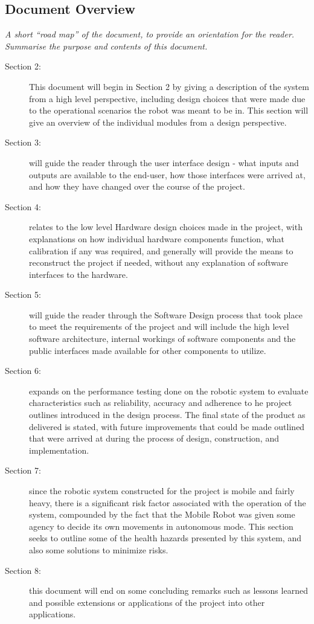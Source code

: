 \documentclass[MTRX3700report.tex]{subfiles}
\begin{document}
\subsection{Document Overview}
  \textit{A short “road map” of the document, to provide an orientation for the reader. Summarise the purpose and contents of this document.}
  \begin{description}
    \item[Section 2:]
      This document will begin in Section 2 by giving a description of the system from a high level perspective, including design choices that were made due to the operational scenarios the robot was meant to be in. This section will give an overview of the individual modules from a design perspective.
    \item[Section 3:]
      will guide the reader through the user interface design - what inputs and outputs are available to the end-user, how those interfaces were arrived at, and how they have changed over the course of the project.
    \item[Section 4:]
      relates to the low level Hardware design choices made in the project, with explanations on how individual hardware components function, what calibration if any was required, and generally will provide the means to reconstruct the project if needed, without any explanation of software interfaces to the hardware.
    \item[Section 5:]
      will guide the reader through the Software Design process that took place to meet the requirements of the project and will include the high level software architecture, internal workings of software components and the public interfaces made available for other components to utilize.
    \item[Section 6:]
      expands on the performance testing done on the robotic system to evaluate characteristics such as reliability, accuracy and adherence to he project outlines introduced in the design process. The final state of the product as delivered is stated, with future improvements that could be made outlined that were arrived at during the process of design, construction, and implementation.
    \item[Section 7:]
      since the robotic system constructed for the project is mobile and fairly heavy, there is a significant risk factor associated with the operation of the system, compounded by the fact that the Mobile Robot was given some agency to decide its own movements in autonomous mode. This section seeks to outline some of the health hazards presented by this system, and also some solutions to minimize risks.
    \item[Section 8:]
      this document will end on some concluding remarks such as lessons learned and possible extensions or applications of the project into other applications.
    \end{description}
\end{document}
